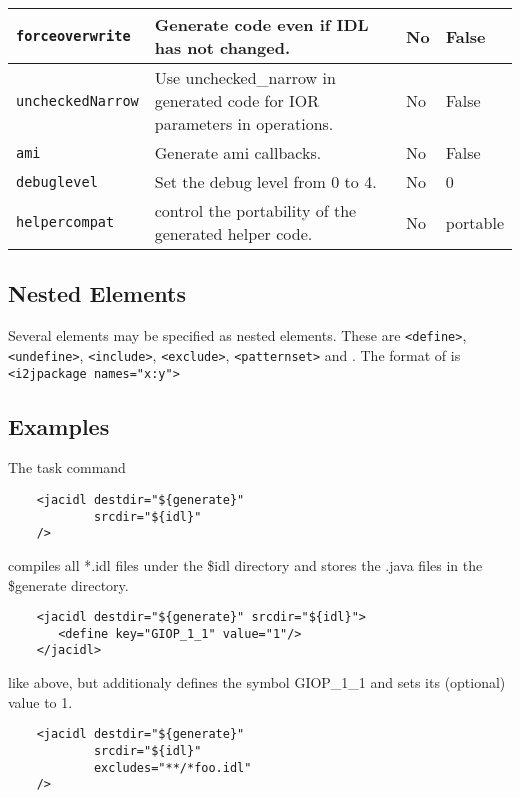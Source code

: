 \begin{small}
\begin{longtable}{|p{4cm}|p{8.5cm}|p{2cm}|p{2cm}|}
\hline
\verb"forceoverwrite" & Generate code even if IDL has not changed. & No & False\\
\hline
\verb"uncheckedNarrow" & Use unchecked\_narrow in generated code for IOR parameters in operations. & No & False\\
\hline
\verb"ami" & Generate ami callbacks. & No & False\\
\hline
\verb"debuglevel" & Set the debug level from 0 to 4. & No & 0\\
\hline
\verb"helpercompat" & control the portability of the generated helper code. & No & portable \\
\hline
\end{longtable}
\end{small}

\subsection*{Nested Elements}

Several elements may be specified as nested elements. These are {\tt <define>}, {\tt <undefine>}, {\tt <include>}, {\tt <exclude>}, {\tt <patternset>} and {\tt <i2jpackage>}. The format of {\tt <i2jpackage>} is {\tt <i2jpackage names="x:y">}


\subsection*{Examples}

The task command
\small{\begin{verbatim}
    <jacidl destdir="${generate}"
            srcdir="${idl}"
    />
\end{verbatim}
}

compiles all *.idl files under the \${idl} directory and stores the .java files in the \${generate} directory.

\small{\begin{verbatim}
    <jacidl destdir="${generate}" srcdir="${idl}">
       <define key="GIOP_1_1" value="1"/>
    </jacidl>
\end{verbatim}
}

like above, but additionaly defines the symbol GIOP\_1\_1 and sets its (optional) value to 1.

\small{\begin{verbatim}
    <jacidl destdir="${generate}"
            srcdir="${idl}"
            excludes="**/*foo.idl"
    />
\end{verbatim}
}

